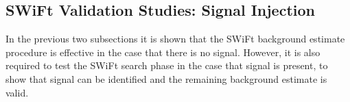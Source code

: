 %

\FloatBarrier

\newpage
\subsection{SWiFt Validation Studies: Signal Injection}
\label{sec:bkg-full_signalInj}

In the previous two subsections it is shown that the SWiFt background estimate procedure is effective in the case that there is no signal.
However, it is also required to test the SWiFt search phase in the case that signal is present, to show that signal can be identified and the remaining background estimate is valid.

